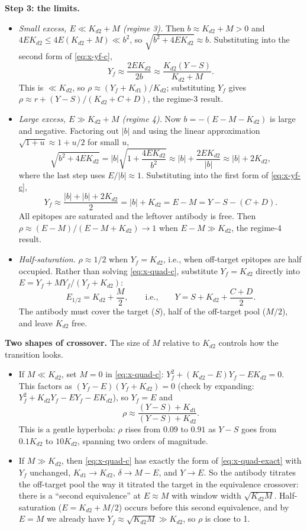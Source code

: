 \textbf{Step 3: the limits.}
\begin{itemize}
    \item \emph{Small excess, $E\ll K_{d2}+M$ (regime 3).} Then
    $b\approx K_{d2}+M>0$ and $4EK_{d2}\le4E(K_{d2}+M)\ll b^2$, so
    $\sqrt{b^2+4EK_{d2}}\approx b$. Substituting into the second form of
    \eqref{eq:x-yf-c},
    $$
    Y_f\approx\frac{2EK_{d2}}{2b}\approx\frac{K_{d2}(Y-S)}{K_{d2}+M}.
    $$
    This is $\ll K_{d2}$, so $\rho\approx(Y_f+K_{d1})/K_{d2}$; substituting
    $Y_f$ gives $\rho\approx r+(Y-S)/(K_{d2}+C+D)$, the regime-3 result.
    \item \emph{Large excess, $E\gg K_{d2}+M$ (regime 4).} Now
    $b=-(E-M-K_{d2})$ is large and negative. Factoring out $|b|$ and using
    the linear approximation $\sqrt{1+u}\approx1+u/2$ for small $u$,
    $$
    \sqrt{b^2+4EK_{d2}}
    =|b|\sqrt{1+\frac{4EK_{d2}}{b^2}}
    \approx|b|+\frac{2EK_{d2}}{|b|}
    \approx|b|+2K_{d2},
    $$
    where the last step uses $E/|b|\approx1$. Substituting into the first form
    of \eqref{eq:x-yf-c},
    $$
    Y_f\approx\frac{|b|+|b|+2K_{d2}}{2}=|b|+K_{d2}=E-M=Y-S-(C+D).
    $$
    All epitopes are saturated and the leftover antibody is free. Then
    $\rho\approx(E-M)/(E-M+K_{d2})\to1$ when $E-M\gg K_{d2}$, the regime-4
    result.
    \item \emph{Half-saturation.} $\rho\approx1/2$ when $Y_f=K_{d2}$, i.e.,
    when off-target epitopes are half occupied. Rather than solving
    \eqref{eq:x-quad-c}, substitute $Y_f=K_{d2}$ directly into
    $E=Y_f+MY_f/(Y_f+K_{d2})$:
    $$
    E_{1/2}=K_{d2}+\frac{M}{2},
    \qquad\text{i.e.,}\qquad
    Y=S+K_{d2}+\frac{C+D}{2}.
    $$
    The antibody must cover the target ($S$), half of the off-target pool
    ($M/2$), and leave $K_{d2}$ free.
\end{itemize}

\textbf{Two shapes of crossover.} The size of $M$ relative to $K_{d2}$
controls how the transition looks.
\begin{itemize}
    \item If $M\ll K_{d2}$, set $M=0$ in \eqref{eq:x-quad-c}:
    $Y_f^2+(K_{d2}-E)Y_f-EK_{d2}=0$. This factors as
    $(Y_f-E)(Y_f+K_{d2})=0$ (check by expanding:
    $Y_f^2+K_{d2}Y_f-EY_f-EK_{d2}$), so $Y_f=E$ and
    $$
    \rho\approx\frac{(Y-S)+K_{d1}}{(Y-S)+K_{d2}}.
    $$
    This is a gentle hyperbola: $\rho$ rises from $0.09$ to $0.91$ as
    $Y-S$ goes from $0.1K_{d2}$ to $10K_{d2}$, spanning two orders of
    magnitude.
    \item If $M\gg K_{d2}$, then \eqref{eq:x-quad-c} has exactly the form of
    \eqref{eq:x-quad-exact} with $Y_f$ unchanged, $K_{d1}\to K_{d2}$,
    $\delta\to M-E$, and $Y\to E$. So the antibody titrates the off-target
    pool the way it titrated the target in the equivalence crossover: there
    is a ``second equivalence'' at $E\approx M$ with window width
    $\sqrt{K_{d2}M}$. Half-saturation ($E=K_{d2}+M/2$) occurs before this
    second equivalence, and by $E=M$ we already have
    $Y_f\approx\sqrt{K_{d2}M}\gg K_{d2}$, so $\rho$ is close to 1.
\end{itemize}

